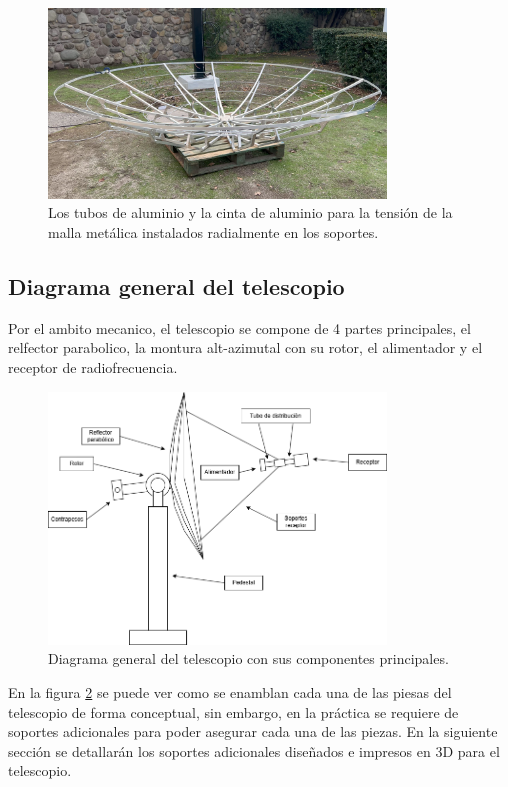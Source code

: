 \begin{figure}
    \centering
    \includegraphics[width=0.8\textwidth]{img/estructura2}
    \caption{Los tubos de aluminio y la cinta de aluminio para la tensión de la malla metálica instalados radialmente en los soportes.}
    \label{fig:ensamble3}
\end{figure}

\subsection{Diagrama general del telescopio}

Por el ambito mecanico, el telescopio se compone de 4 partes principales, el relfector parabolico, la montura alt-azimutal con su rotor, el alimentador y el receptor de radiofrecuencia.\\

\begin{figure}
    \centering
    \includegraphics[width=0.8\textwidth]{img/general}
    \caption{Diagrama general del telescopio con sus componentes principales.}
    \label{fig:ensambleGen}
\end{figure}

En la figura \ref{fig:ensambleGen} se puede ver como se enamblan cada una de las piesas del telescopio de forma conceptual, sin embargo, en la práctica se requiere de soportes adicionales para poder asegurar cada una de las piezas. En la siguiente sección se detallarán los soportes adicionales diseñados e impresos en 3D para el telescopio.\\

